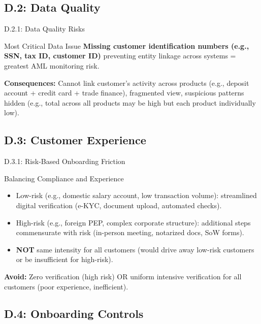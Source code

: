 \documentclass{beamer}
\begin{document}
	\subsection{D.2: Data Quality}
	
	\begin{frame}{D.2.1: Data Quality Risks}
		\begin{block}{Most Critical Data Issue}
			\textbf{Missing customer identification numbers (e.g., SSN, tax ID, customer ID)} preventing entity linkage across systems = greatest AML monitoring risk.
		\end{block}
		\textbf{Consequences:} Cannot link customer's activity across products (e.g., deposit account + credit card + trade finance), fragmented view, suspicious patterns hidden (e.g., total across all products may be high but each product individually low).
	\end{frame}
	
	\subsection{D.3: Customer Experience}
	
	\begin{frame}{D.3.1: Risk-Based Onboarding Friction}
		\begin{block}{Balancing Compliance and Experience}
			\begin{itemize}
				\item Low-risk (e.g., domestic salary account, low transaction volume): streamlined digital verification (e-KYC, document upload, automated checks).
				\item High-risk (e.g., foreign PEP, complex corporate structure): additional steps commensurate with risk (in-person meeting, notarized docs, SoW forms).
				\item \textbf{NOT} same intensity for all customers (would drive away low-risk customers or be insufficient for high-risk).
			\end{itemize}
		\end{block}
		\textbf{Avoid:} Zero verification (high risk) OR uniform intensive verification for all customers (poor experience, inefficient).
	\end{frame}
	
	\subsection{D.4: Onboarding Controls}
	
\end{document}

